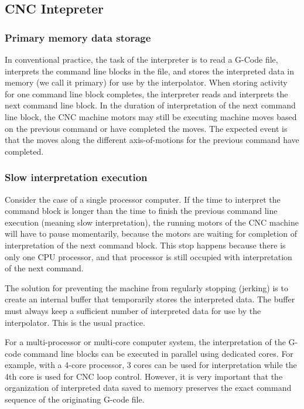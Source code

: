 \subsection{CNC Intepreter}

\subsubsection{Primary memory data storage}

In conventional practice, the task of the interpreter is to read a G-Code file, interprets the command line blocks in the file, and stores the interpreted data in memory (we call it primary) for use by the interpolator. When storing activity for one command line block completes, the interpreter reads and interprets the next command line block. In the duration of interpretation of the next command line block, the CNC machine motors may still be executing machine moves based on the previous command or have completed the moves. The expected event is that the moves along the different axis-of-motions for the previous command have completed. 

\subsubsection{Slow interpretation execution}

Consider the case of a single processor computer. If the time to interpret the command block is longer than the time to finish the previous command line execution (meaning slow interpretation), the running motors of the CNC machine will have to pause momentarily, because the motors are waiting for completion of interpretation of the next command block. This stop happens because there is only one CPU processor, and that processor is still occupied with interpretation of the next command. 
\vspace*{1\baselineskip}

The solution for preventing the machine from regularly stopping (jerking) is to create an internal buffer that temporarily stores the interpreted data. The buffer must always keep a sufficient number of interpreted data for use by the interpolator. This is the usual practice.
\vspace*{1\baselineskip}

For a multi-processor or multi-core computer system, the interpretation of the G-code command line blocks can be executed in parallel using dedicated cores. For example, with a 4-core processor, 3 cores can be used for interpretation while the 4th core is used for CNC loop control. However, it is very important that the organization of interpreted data saved to memory preserves the exact command sequence of the originating G-code file. 

